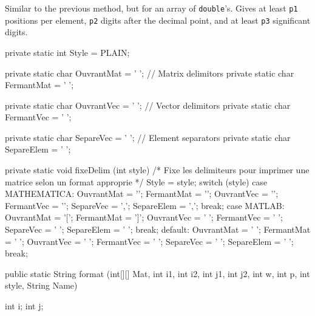  \begin{tabb}  Similar to the previous method, but for an array of \texttt{double}'s.
  Gives at least \texttt{p1} positions per element,
  \texttt{p2} digits after the decimal point, and at least \texttt{p3}
  significant digits.
 \end{tabb}
\begin{htmlonly}
\end{htmlonly}
\begin{code}
\begin{hide}
   private static int Style = PLAIN;

   private static char OuvrantMat = ' ';     // Matrix delimitors
   private static char FermantMat = ' ';

   private static char OuvrantVec = ' ';     // Vector delimitors
   private static char FermantVec = ' ';

   private static char SepareVec = ' ';      // Element separators
   private static char SepareElem = ' ';

   private static void fixeDelim (int style) {
      /* Fixe les delimiteurs pour imprimer une matrice selon un format
         approprie */
      Style = style;
      switch (style) {
      case MATHEMATICA:
         OuvrantMat = '{';
         FermantMat = '}';
         OuvrantVec = '{';
         FermantVec = '}';
         SepareVec = ',';
         SepareElem = ',';
         break;
      case MATLAB:
         OuvrantMat = '[';
         FermantMat = ']';
         OuvrantVec = ' ';
         FermantVec = ' ';
         SepareVec = ' ';
         SepareElem = ' ';
         break;
      default:
         OuvrantMat = ' ';
         FermantMat = ' ';
         OuvrantVec = ' ';
         FermantVec = ' ';
         SepareVec = ' ';
         SepareElem = ' ';
         break;
      }
   }\end{hide}

   public static String format (int[][] Mat, int i1, int i2,
                                int j1, int j2, int w, int p,
                                int style, String Name)\begin{hide} {
      int i;
      int j;

}
\end{hide}
\end{code}
